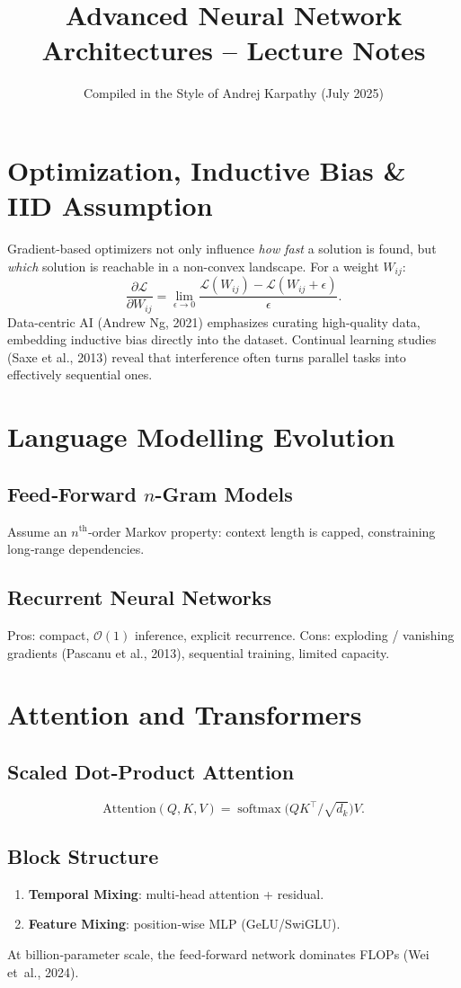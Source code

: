 \documentclass{article}
\title{Advanced Neural Network Architectures -- Lecture Notes}
\author{Compiled in the Style of Andrej Karpathy (July 2025)}
\date{}
\begin{document}
\maketitle

\section{Optimization, Inductive Bias \& IID Assumption}
Gradient-based optimizers not only influence \emph{how fast} a solution is found, but \emph{which} solution is reachable in a non-convex landscape. 
For a weight $W_{ij}$:
\[
\frac{\partial \mathcal{L}}{\partial W_{ij}} = 
\lim_{\epsilon\to 0} \frac{\mathcal{L}(W_{ij}) - \mathcal{L}(W_{ij}+\epsilon)}{\epsilon}.
\]
Data-centric AI (Andrew Ng, 2021) emphasizes curating high-quality data, embedding inductive bias directly into the dataset. 
Continual learning studies (Saxe et al., 2013) reveal that interference often turns parallel tasks into effectively sequential ones.

\section{Language Modelling Evolution}
\subsection{Feed‑Forward \texorpdfstring{$n$}{n}-Gram Models}
Assume an $n^{\text{th}}$‑order Markov property: context length is capped, constraining long‑range dependencies.

\subsection{Recurrent Neural Networks}
Pros: compact, $\mathcal{O}(1)$ inference, explicit recurrence. %
Cons: exploding / vanishing gradients (Pascanu et al., 2013), sequential training, limited capacity.

\section{Attention and Transformers}
\subsection{Scaled Dot‑Product Attention}
\[
\text{Attention}(Q,K,V)=\operatorname{softmax}\!\bigl(QK^{\top}/\sqrt{d_k}\bigr)V.
\]

\subsection{Block Structure}
\begin{enumerate}
  \item \textbf{Temporal Mixing}: multi‑head attention + residual.
  \item \textbf{Feature Mixing}: position‑wise MLP (GeLU/SwiGLU).
\end{enumerate}
At billion‑parameter scale, the feed‑forward network dominates FLOPs (Wei et al., 2024).
\end{document}
